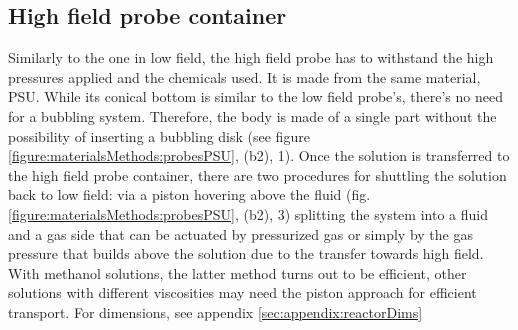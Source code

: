         \subsection{High field probe container}
        \label{sec:matMeth:highFieldProbe}
        Similarly to the one in low field, the high field probe has to withstand the high pressures applied and the chemicals used. It is made from the same material, PSU.  While its conical bottom is similar to the low field probe's, there's no need for a bubbling system.  Therefore, the body is made of a single part without the possibility of inserting a bubbling disk (see figure \ref{figure:materialsMethods:probesPSU}, (b2), 1).  Once the solution is transferred to the high field probe container, there are two procedures for shuttling the solution back to low field: via a piston hovering above the fluid (fig. \ref{figure:materialsMethods:probesPSU}, (b2), 3) splitting the system into a fluid and a gas side that can be actuated by pressurized gas or simply by the gas pressure that builds above the solution due to the transfer towards high field.  With methanol solutions, the latter method turns out to be efficient, other solutions with different viscosities may need the piston approach for efficient transport.
        For dimensions, see appendix \ref{sec:appendix:reactorDims}
